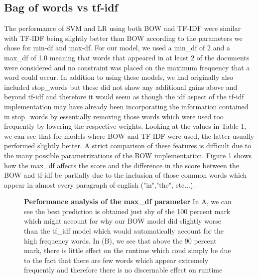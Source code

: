 \documentclass{amsart}
\theoremstyle{definition}
\theoremstyle{remark}
\numberwithin{equation}{section}
\begin{document}
 \subsection{Bag of words vs tf-idf}
The performance of SVM and LR using both BOW and TF-IDF were similar with TF-IDF being slightly better than BOW according to the parameters we chose for min-df and max-df.  For our model, we used a min\_df of 2 and a max\_df of 1.0 meaning that words that appeared in at least 2 of the documents were considered and no constraint was placed on the maximum frequency that a word could occur.  In addition to using these models, we had originally also included stop\_words but these did not show any additional gains above and beyond tf-idf and therefore it would seem as though the idf aspect of the tf-idf implementation may have already been incorporating the information contained in stop\_words by essentially removing those words which were used too frequently by lowering the respective weights.  Looking at the values in Table 1, we can see that for models where BOW and TF-IDF were used, the latter usually performed slightly better.  A strict comparison of these features is difficult due to the many possible parametrizations of the BOW implementation.  Figure 1 shows how the max\_df affects the score and the difference in the score between the BOW and tf-idf be partially due to the inclusion of those common words which appear in almost every paragraph of english ("in","the", etc...).
\begin{figure}
	\centering
	\qquad
	\caption{\textbf{Performance analysis of the max\_df parameter}  In A,  we can see the best prediction is obtained just shy of the 100 percent mark which might account for why our BOW model did slightly worse than the tf\_idf model which would automatically account for the high frequency words.  In (B), we see that above the 90 percent mark, there is little effect on the runtime which coud simply be due to the fact that there are few words which appear extremely frequently and therefore there is no discernable effect on runtime}
	\label{fig:betavsMSE}
\end{figure}
\end{document}
